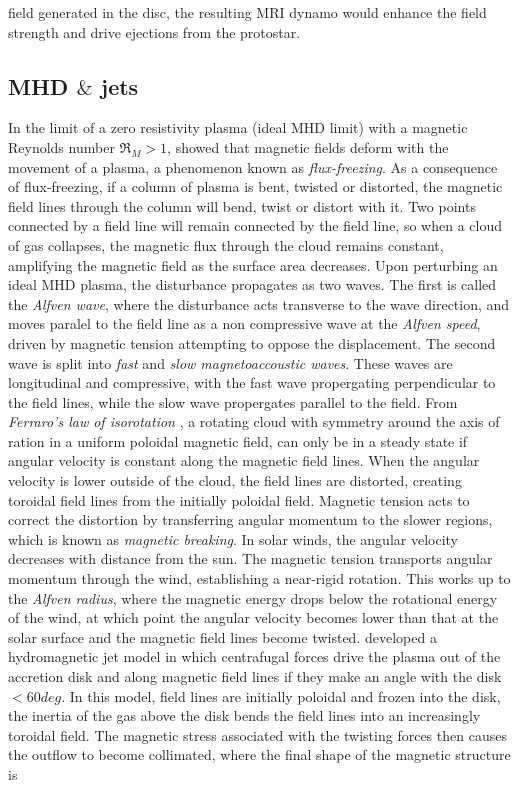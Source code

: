\documentclass[11pt]{article}
\begin{document}
field generated in the disc, the resulting MRI dynamo would enhance the field strength and drive ejections from the protostar.












\subsection{MHD $\&$ jets}
\label{sub:MHD}
In the limit of a zero resistivity plasma (ideal MHD limit) with a magnetic Reynolds number $\Re_{M}>1$, \cite{Alfven1942} showed that magnetic fields deform with the movement of a plasma, a phenomenon known as \emph{flux-freezing}. As a consequence of flux-freezing, if a column of plasma is bent, twisted or distorted, the magnetic field lines through the column will bend, twist or distort with it. Two points connected by a field line will remain connected by the field line, so when a cloud of gas collapses, the magnetic flux through the cloud remains constant, amplifying the magnetic field as the surface area decreases. Upon perturbing an ideal MHD plasma, the disturbance propagates as two waves. The first is called the \emph{Alfven wave}, where the disturbance acts transverse to the wave direction, and moves paralel to the field line as a non compressive wave at the \emph{Alfven speed}, driven by magnetic tension attempting to oppose the displacement. The second wave is split into \emph{fast} and \emph{slow magnetoaccoustic waves}. These waves are longitudinal and compressive, with the fast wave propergating perpendicular to the field lines, while the slow wave propergates parallel to the field. From \emph{Ferraro's law of isorotation} \citep{Ferraro1937}, a rotating cloud with symmetry around the axis of ration in a uniform poloidal magnetic field, can only be in a steady state if angular velocity is constant along the magnetic field lines. When the angular velocity is lower outside of the cloud, the field lines are distorted, creating toroidal field lines from the initially poloidal field. Magnetic tension acts to correct the distortion by transferring angular momentum to the slower regions, which is known as \emph{magnetic breaking}. In solar winds, the angular velocity decreases with distance from the sun. The magnetic tension transports angular momentum through the wind, establishing a near-rigid rotation. This works up to the \emph{Alfven radius}, where the magnetic energy drops below the rotational energy of the wind, at which point the angular velocity becomes lower than that at the solar surface and the magnetic field lines become twisted. \cite{Blandford1982} developed a hydromagnetic jet model in which centrafugal forces drive the plasma out of the accretion disk and along magnetic field lines if they make an angle with the disk $<60deg$. In this model, field lines are initially poloidal and frozen into the disk, the inertia of the gas above the disk bends the field lines into an increasingly toroidal field. The magnetic stress associated with the twisting forces then causes the outflow to become collimated, where the final shape of the magnetic structure is 
\end{document}
